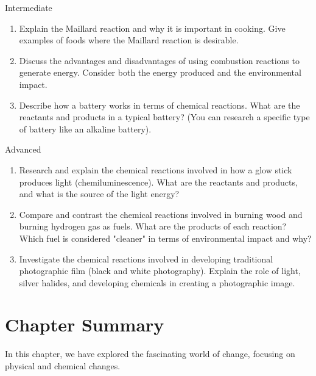 \begin{tieredquestions}{Intermediate}
\begin{enumerate}
    \item Explain the Maillard reaction and why it is important in cooking. Give examples of foods where the Maillard reaction is desirable.
    \item Discuss the advantages and disadvantages of using combustion reactions to generate energy. Consider both the energy produced and the environmental impact.
    \item  Describe how a battery works in terms of chemical reactions. What are the reactants and products in a typical battery? (You can research a specific type of battery like an alkaline battery).
\end{enumerate}
\end{tieredquestions}

\begin{tieredquestions}{Advanced}
\begin{enumerate}
    \item Research and explain the chemical reactions involved in how a glow stick produces light (chemiluminescence). What are the reactants and products, and what is the source of the light energy?
    \item  Compare and contrast the chemical reactions involved in burning wood and burning hydrogen gas as fuels. What are the products of each reaction? Which fuel is considered "cleaner" in terms of environmental impact and why? 
    \item  Investigate the chemical reactions involved in developing traditional photographic film (black and white photography). Explain the role of light, silver halides, and developing chemicals in creating a photographic image.
\end{enumerate}
\end{tieredquestions}


\section*{Chapter Summary}

In this chapter, we have explored the fascinating world of change, focusing on physical and chemical changes.


